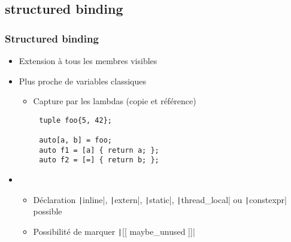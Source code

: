 \documentclass[C++.tex]{subfiles}
\begin{document}
\subsection*{structured binding}
\begin{frame}[fragile]
	\frametitle{Structured binding}
	\begin{itemize}
		\item Extension à tous les membres visibles


		\item Plus proche de variables classiques
		\begin{itemize}
			\item Capture par les lambdas (copie et référence)
		\end{itemize}
	\end{itemize}


	\begin{verbatim}
		tuple foo{5, 42};

		auto[a, b] = foo;
		auto f1 = [a] { return a; };
		auto f2 = [=] { return b; };
	\end{verbatim}

	\begin{itemize}
		\item [] \begin{itemize}
			\item Déclaration \texttt|inline|, \texttt|extern|, \texttt|static|, \texttt|thread_local| ou \texttt|constexpr| possible
			\item Possibilité de marquer \texttt|[[ maybe_unused ]]|
		\end{itemize}
	\end{itemize}


\end{frame}
\end{document}
